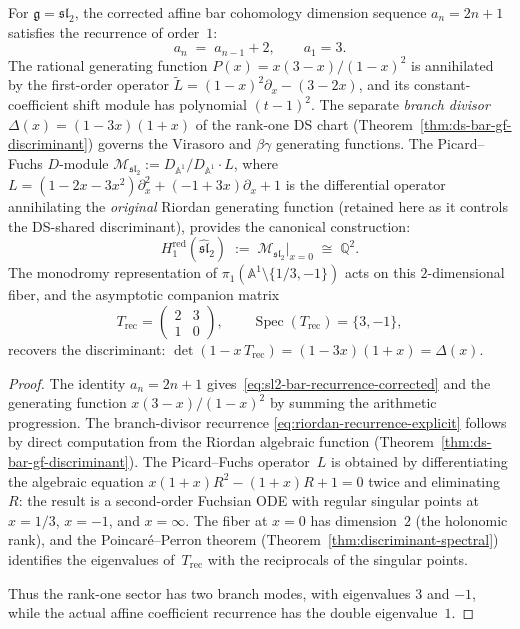 \begin{proposition}
\label{prop:hred-sl2}
For $\mathfrak{g} = \mathfrak{sl}_2$, the corrected affine bar
cohomology dimension sequence $a_n = 2n+1$ satisfies
the recurrence of order~$1$:
\begin{equation}\label{eq:sl2-bar-recurrence-corrected}
a_n \;=\; a_{n-1} + 2,
\qquad a_1 = 3.
\end{equation}
The rational generating function
$P(x) = x(3-x)/(1-x)^2$ is annihilated by the
first-order operator
$\widetilde{L} = (1-x)^2 \partial_x - (3-2x)$,
and its constant-coefficient shift module has polynomial $(t-1)^2$.
The separate \emph{branch divisor}
$\Delta(x) = (1-3x)(1+x)$ of the rank-one DS chart
(Theorem~\ref{thm:ds-bar-gf-discriminant})
governs the Virasoro and $\beta\gamma$ generating functions.  The
Picard--Fuchs $D$-module
$\mathcal{M}_{\mathfrak{sl}_2}
:= D_{\mathbb{A}^1} / D_{\mathbb{A}^1} \cdot L$,
where $L = (1 - 2x - 3x^2)\partial_x^2
+ (-1 + 3x)\partial_x + 1$
is the differential operator annihilating the
\emph{original} Riordan generating function
(retained here as it controls the DS-shared discriminant),
provides the canonical construction:
\[
H^{\mathrm{red}}_1(\widehat{\mathfrak{sl}}_2)
\;:=\; \mathcal{M}_{\mathfrak{sl}_2}\big|_{x=0}
\;\cong\; \mathbb{Q}^2.
\]
The monodromy representation of
$\pi_1(\mathbb{A}^1 \setminus \{1/3, -1\})$ acts on this
$2$-dimensional fiber, and the asymptotic companion matrix
\[
T_{\mathrm{rec}} =
\begin{pmatrix} 2 & 3 \\ 1 & 0 \end{pmatrix},
\qquad
\operatorname{Spec}(T_{\mathrm{rec}}) = \{3, -1\},
\]
recovers the discriminant:
$\det(1 - x\, T_{\mathrm{rec}}) = (1-3x)(1+x) = \Delta(x)$.
\end{proposition}

\begin{proof}
The identity $a_n=2n+1$ gives~\eqref{eq:sl2-bar-recurrence-corrected}
and the generating function $x(3-x)/(1-x)^2$ by summing the arithmetic
progression.  The branch-divisor recurrence
\eqref{eq:riordan-recurrence-explicit} follows by direct computation
from the Riordan algebraic function
(Theorem~\ref{thm:ds-bar-gf-discriminant}).
The Picard--Fuchs operator~$L$ is obtained by differentiating
the algebraic equation
$x(1{+}x)R^2 - (1{+}x)R + 1 = 0$
twice and eliminating~$R$: the result is a second-order Fuchsian
ODE with regular singular points at $x = 1/3$, $x = -1$, and
$x = \infty$. The fiber at $x = 0$ has dimension~$2$ (the
holonomic rank), and the
Poincar\'e--Perron theorem
(Theorem~\ref{thm:discriminant-spectral})
identifies the eigenvalues of~$T_{\mathrm{rec}}$ with the
reciprocals of the singular points.

Thus the rank-one sector has two branch modes, with eigenvalues
$3$ and $-1$, while the actual affine coefficient recurrence has the
double eigenvalue~$1$.
\end{proof}

